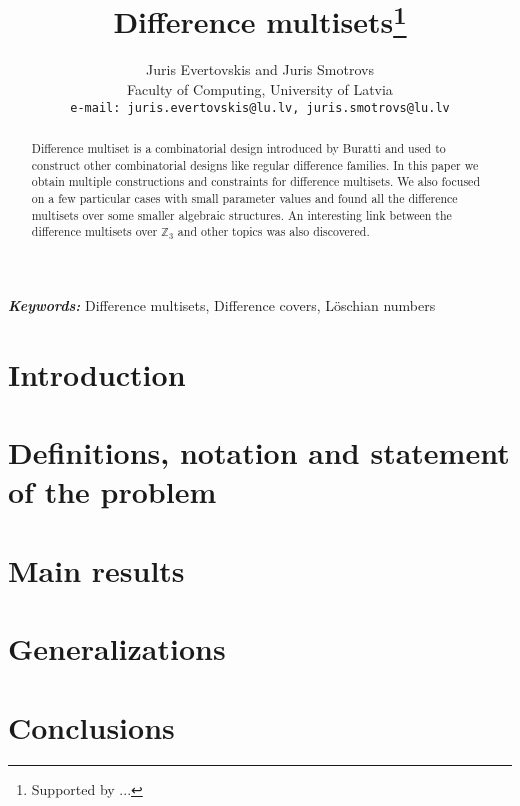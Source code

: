 \documentclass{article}
\theoremstyle{plain}
\theoremstyle{definition}
\theoremstyle{remark}
\providecommand{\keywords}[1]{\textbf{\textit{Keywords: }} #1}
\begin{document}
\title{Difference multisets\thanks{Supported by ...}}
\date{}
\author{Juris Evertovskis and Juris Smotrovs\\
\small Faculty of Computing, University of Latvia\\
{\small \tt e-mail: juris.evertovskis@lu.lv, juris.smotrovs@lu.lv}}

\maketitle
	
	\begin{abstract}
		Difference multiset is a combinatorial design introduced by Buratti \cite{buratti1999old} and used to construct other combinatorial designs like regular difference families. In this paper we obtain multiple constructions and constraints for difference multisets. We also focused on a few particular cases with small parameter values and found all the difference multisets over some smaller algebraic structures. An interesting link between the difference multisets over $\mathbb Z_3$ and other topics was also discovered.
	\end{abstract}
	
	\keywords{Difference multisets, Difference covers, Löschian numbers}
    
    \section{Introduction}
    
     
	\section{Definitions, notation and statement of the problem}
    
	
    \section{Main results}
    
	
    \section{Generalizations}
    

    \section{Conclusions}
    
    
	
	
\end{document}
